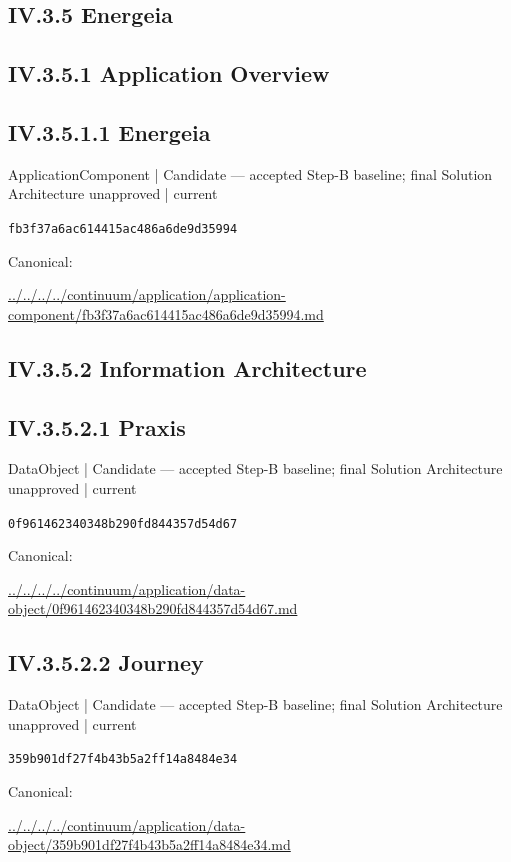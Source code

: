 \documentclass[10pt,a4paper]{article}
\begin{document}
\subsection*{IV.3.5 Energeia}
\subsection*{IV.3.5.1 Application Overview}
\subsection*{IV.3.5.1.1 Energeia}
\label{element-fb3f37a6ac614415ac486a6de9d35994}
{\small ApplicationComponent | Candidate — accepted Step-B baseline; final Solution Architecture unapproved | current}\par
\texttt{fb3f37a6ac614415ac486a6de9d35994}\par
Canonical: \par
{\footnotesize\url{../../../../continuum/application/application-component/fb3f37a6ac614415ac486a6de9d35994.md}}\par
\subsection*{IV.3.5.2 Information Architecture}
\subsection*{IV.3.5.2.1 Praxis}
\label{element-0f961462340348b290fd844357d54d67}
{\small DataObject | Candidate — accepted Step-B baseline; final Solution Architecture unapproved | current}\par
\texttt{0f961462340348b290fd844357d54d67}\par
Canonical: \par
{\footnotesize\url{../../../../continuum/application/data-object/0f961462340348b290fd844357d54d67.md}}\par
\subsection*{IV.3.5.2.2 Journey}
\label{element-359b901df27f4b43b5a2ff14a8484e34}
{\small DataObject | Candidate — accepted Step-B baseline; final Solution Architecture unapproved | current}\par
\texttt{359b901df27f4b43b5a2ff14a8484e34}\par
Canonical: \par
{\footnotesize\url{../../../../continuum/application/data-object/359b901df27f4b43b5a2ff14a8484e34.md}}\par
\end{document}
